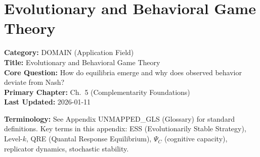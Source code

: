 \section{Evolutionary and Behavioral Game Theory}
\label{app:evolutionary-behavioral-gt}


\begin{tcolorbox}[colback=gray!5!white, colframe=gray!75!black,
    title=\textbf{Appendix: AD DOMAIN-EVGT}]
\textbf{Category:} DOMAIN (Application Field) \\
\textbf{Title:} Evolutionary and Behavioral Game Theory \\
\textbf{Core Question:} How do equilibria emerge and why does observed behavior deviate from Nash? \\
\textbf{Primary Chapter:} Ch.\ 5 (Complementarity Foundations) \\
\textbf{Last Updated:} 2026-01-11
\end{tcolorbox}

\begin{tcolorbox}[colback=gray!5!white, colframe=gray!50!black]
\textbf{Terminology:} See Appendix UNMAPPED_GLS (Glossary) for standard definitions.
Key terms in this appendix: ESS (Evolutionarily Stable Strategy), Level-$k$,
QRE (Quantal Response Equilibrium), $\Psi_C$ (cognitive capacity),
replicator dynamics, stochastic stability.
\end{tcolorbox}

